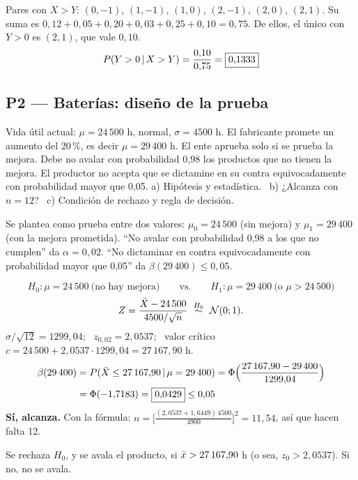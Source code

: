 Pares con $X>Y$: $(0,-1)$, $(1,-1)$, $(1,0)$, $(2,-1)$, $(2,0)$, $(2,1)$. Su suma es $0{,}12+0{,}05+0{,}20+0{,}03+0{,}25+0{,}10=0{,}75$. De ellos, el único con $Y>0$ es $(2,1)$, que vale $0{,}10$.
\[
P(Y>0\,|\,X>Y)=\frac{0{,}10}{0{,}75}=\boxed{0{,}1333}
\]

\subsection{P2 --- Baterías: diseño de la prueba}
\begin{enun}
Vida útil actual: $\mu=24\,500$ h, normal, $\sigma=4500$ h. El fabricante promete un aumento del 20\,\%, es decir $\mu=29\,400$ h. El ente aprueba solo si se prueba la mejora. Debe no avalar con probabilidad 0,98 los productos que no tienen la mejora. El productor no acepta que se dictamine en su contra equivocadamente con probabilidad mayor que 0,05.
a) Hipótesis y estadística. \ b) ¿Alcanza con $n=12$? \ c) Condición de rechazo y regla de decisión.
\end{enun}
\begin{metodo}
Se plantea como prueba entre dos valores: $\mu_0=24\,500$ (sin mejora) y $\mu_1=29\,400$ (con la mejora prometida). ``No avalar con probabilidad 0,98 a los que no cumplen'' da $\alpha=0{,}02$. ``No dictaminar en contra equivocadamente con probabilidad mayor que 0,05'' da $\beta(29\,400)\le0{,}05$.
\end{metodo}
\[
H_0:\mu=24\,500\ \text{(no hay mejora)}\qquad\text{vs.}\qquad H_1:\mu=29\,400\ \text{(o }\mu>24\,500)
\]
\[
Z=\frac{\Xb-24\,500}{4500/\sqrt n}\ \overset{H_0}{\sim}\ \Nor(0;1).
\]
$\sigma/\sqrt{12}=1299{,}04$; \ $z_{0,02}=2{,}0537$; \ valor crítico $c=24\,500+2{,}0537\cdot1299{,}04=27\,167{,}90$ h.
\begin{align*}
\beta(29\,400)&=P(\bar{X}\le27\,167{,}90\,|\,\mu=29\,400)=\Phi\Big(\frac{27\,167{,}90-29\,400}{1299{,}04}\Big)\\
&=\Phi(-1{,}7183)=\boxed{0{,}0429}\le0{,}05
\end{align*}
\textbf{Sí, alcanza.} Con la fórmula: $n=\big[\frac{(2{,}0537+1{,}6449)\,4500}{4900}\big]^2=11{,}54$, así que hacen falta 12.

Se rechaza $H_0$, y se avala el producto, si $\bar{x}>27\,167{,}90$ h (o sea, $z_0>2{,}0537$). Si no, no se avala.

